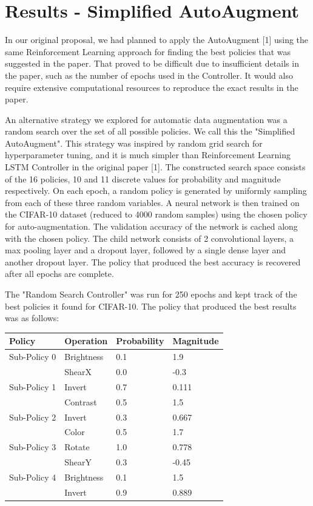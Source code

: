\documentclass[10pt,twocolumn,letterpaper]{article}
\begin{document}
\section{Results - Simplified AutoAugment}


In our original proposal, we had planned to apply the AutoAugment [1] using the same Reinforcement Learning approach for finding the best policies that was suggested in the paper.  That proved to be difficult due to insufficient details in the paper, such as the number of epochs used in the Controller.  It would also require extensive computational resources to reproduce the exact results in the paper.

An alternative strategy we explored for automatic data augmentation was a random search over the set of all possible policies. We call this the "Simplified AutoAugment".  This strategy was inspired by random grid search for hyperparameter tuning, and it is much simpler than Reinforcement Learning LSTM Controller in the original paper [1]. The constructed search space consists of the 16 policies, 10 and 11 discrete values for probability and magnitude respectively. On each epoch, a random policy is generated by uniformly sampling from each of these three random variables. A neural network is then trained on the CIFAR-10 dataset (reduced to 4000 random samples) using the chosen policy for auto-augmentation. The validation accuracy of the network is cached along with the chosen policy. The child network consists of 2 convolutional layers, a max pooling layer and a dropout layer, followed by a single dense layer and another dropout layer. The policy that produced the best accuracy is recovered after all epochs are complete.

The "Random Search Controller" was run for 250 epochs and kept track of the best policies it found for CIFAR-10. The policy that produced the best results was as follows:

		\begin{table}[h]
			\begin{tabular}{llll}
				\hline
				Policy &Operation &Probability&Magnitude   \\ \hline
				Sub-Policy 0 &Brightness &0.1&1.9\\
				&ShearX &0.0 &-0.3\\

				Sub-Policy 1 &Invert &0.7&0.111\\
				&Contrast &0.5 &1.5\\

				Sub-Policy 2 &Invert &0.3&0.667\\
				&Color &0.5 &1.7\\

				Sub-Policy 3 &Rotate &1.0&0.778\\
				&ShearY &0.3 &-0.45\\

				Sub-Policy 4 &Brightness &0.1&1.5\\
				&Invert &0.9 &0.889\\
				\hline
			\end{tabular}
		\end{table}
\end{document}
